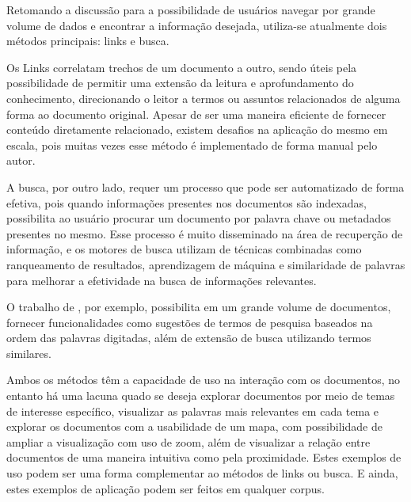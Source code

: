 \documentclass[12pt,a4paper]{article}
\begin{document}
   
   Retomando a discussão para a possibilidade de usuários navegar por grande volume de dados e encontrar a informação desejada, utiliza-se atualmente dois métodos principais:
   links e busca. 
   
   Os Links correlatam trechos de um documento a outro, sendo úteis pela possibilidade de permitir uma extensão da leitura e aprofundamento do conhecimento,
   direcionando o leitor a termos ou assuntos relacionados de alguma forma ao documento original. Apesar de ser uma maneira eficiente de fornecer conteúdo diretamente relacionado,
   existem desafios na aplicação do mesmo em escala, pois muitas vezes esse método é implementado de forma manual pelo autor. 
   
   A busca, por outro lado,
   requer um processo que pode ser automatizado de forma efetiva, pois quando informações presentes nos documentos são indexadas, possibilita ao usuário procurar um documento por palavra chave ou metadados presentes no mesmo.
   Esse processo é muito disseminado na área de recuperção de informação, e os motores de busca utilizam de técnicas combinadas como ranqueamento de resultados, aprendizagem de máquina e similaridade de palavras para melhorar a efetividade na busca de informações relevantes.
  
   O trabalho de , por exemplo, possibilita em um grande volume de documentos, fornecer funcionalidades como sugestões de termos de pesquisa baseados na ordem das palavras digitadas, além de extensão de busca utilizando termos similares.
  
  Ambos os métodos têm a capacidade de uso na interação com os documentos, no entanto há uma lacuna quado se deseja explorar documentos por meio de temas de interesse específico,
   visualizar as palavras mais relevantes em cada tema e explorar os documentos com a usabilidade de um mapa, com possibilidade de ampliar a visualização com uso de zoom, além de visualizar a relação entre documentos de uma maneira intuitiva como pela proximidade. Estes exemplos de uso podem ser uma forma complementar ao métodos de links ou busca. E ainda, estes exemplos de aplicação podem ser feitos em qualquer corpus.
   
  
\end{document}
